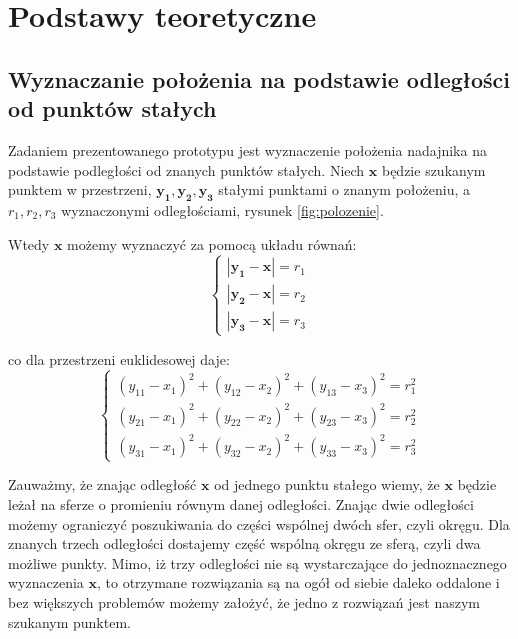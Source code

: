 \chapter{Podstawy teoretyczne}
\section{Wyznaczanie położenia na podstawie odległości od punktów stałych}

Zadaniem prezentowanego prototypu jest wyznaczenie położenia nadajnika na podstawie
podległości od znanych punktów stałych. Niech $\boldsymbol{x}$ będzie szukanym punktem w przestrzeni,
$\boldsymbol{y_1,y_2,y_3}$ stałymi punktami o znanym położeniu, a $r_1,r_2,r_3$ wyznaczonymi odległościami, 
rysunek \ref{fig:polozenie}. 

Wtedy $\boldsymbol{x}$ możemy wyznaczyć za pomocą układu równań:
\[
 \begin{cases}
    |\boldsymbol{y_1} - \boldsymbol{x}| = r_1
 \\ |\boldsymbol{y_2} - \boldsymbol{x}| = r_2
 \\ |\boldsymbol{y_3} - \boldsymbol{x}| = r_3
 \end{cases}
\]

co dla przestrzeni euklidesowej daje:
\[
 \begin{cases}
     (y_{11}-x_1)^2 + (y_{12}-x_2)^2 + (y_{13}-x_3)^2 = r_1^2
 \\  (y_{21}-x_1)^2 + (y_{22}-x_2)^2 + (y_{23}-x_3)^2 = r_2^2
 \\  (y_{31}-x_1)^2 + (y_{32}-x_2)^2 + (y_{33}-x_3)^2 = r_3^2
 \end{cases}
\]

Zauważmy, że znając odległość $\boldsymbol{x}$ od jednego punktu stałego wiemy, że $\boldsymbol{x}$ będzie leżał na
sferze o promieniu równym danej odległości. Znając dwie odległości możemy ograniczyć poszukiwania do części wspólnej dwóch sfer,
czyli okręgu. Dla znanych trzech odległości dostajemy część wspólną okręgu ze sferą, czyli dwa możliwe punkty.
Mimo, iż trzy odległości nie są wystarczające do jednoznacznego wyznaczenia $\boldsymbol{x}$, 
to otrzymane rozwiązania są na ogół od siebie daleko oddalone i bez większych problemów
możemy założyć, że jedno z rozwiązań jest naszym szukanym punktem.

